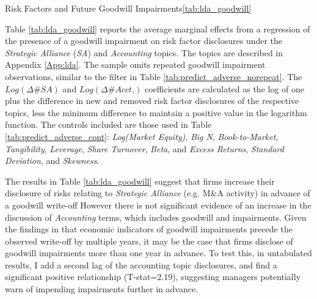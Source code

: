 \begin{thesistable}{Risk Factors and Future Goodwill Impairments}{\ref{tab:lda_goodwill}}
	\label{tab:lda_goodwill}
	
	Table \ref{tab:lda_goodwill} reports the average marginal effects from a regression of the presence of a goodwill impairment on risk factor disclosures under the \textit{Strategic Alliance} (\textit{SA}) and \textit{Accounting} topics.
	The topics are described in Appendix \ref{App:lda}.
	The sample omits repeated goodwill impairment observations, similar to the filter in Table \ref{tab:predict_adverse_norepeat}.
	The $Log(\Delta \# SA)$ and $Log(\Delta \# Acct.)$ coefficients are calculated as the log of one plus the difference in new and removed risk factor disclosures of the respective topics, less the minimum difference to maintain a positive value in the logarithm function.
    The controls included are those used in Table \ref{tab:predict_adverse_cont}: \textit{Log(Market Equity)}, \textit{Big N}, \textit{Book-to-Market}, \textit{Tangibility}, \textit{Leverage}, \textit{Share Turnover}, \textit{Beta}, and \textit{Excess Returns}, \textit{Standard Deviation}, and \textit{Skewness}.
    \postamble
	
	\startdata
	
\end{thesistable}

The results in Table \ref{tab:lda_goodwill} suggest that firms increase their disclosure of risks relating to \textit{Strategic Alliance} (e.g. M\&A activity) in advance of a goodwill write-off
However there is not significant evidence of an increase in the discussion of \textit{Accounting} terms, which includes goodwill and impairments.
Given the findings in \cite{hayn_2006} that economic indicators of goodwill impairments precede the observed write-off by multiple years, it may be the case that firms disclose of goodwill impairments more than one year in advance.
To test this, in untabulated results, I add a second lag of the accounting topic disclosures, and find a significant positive relationship (T-stat=2.19), suggesting managers potentially warn of impending impairments further in advance.



